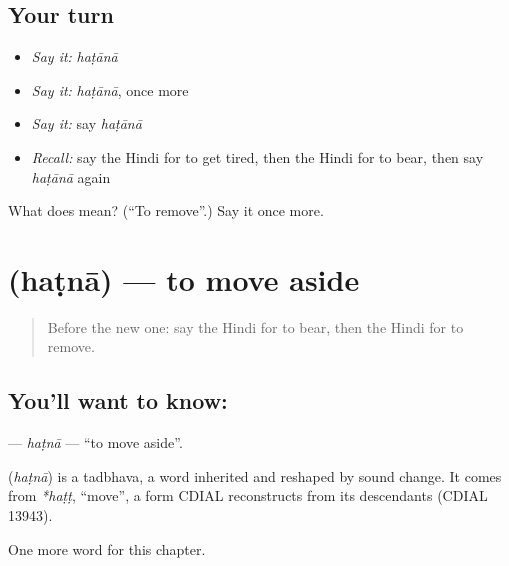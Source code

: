 \subsection*{Your turn}
\begin{itemize}
\raggedright
  \item \emph{Say it:} \emph{haṭānā}
  \item \emph{Say it:} \emph{haṭānā}, once more
  \item \emph{Say it:} say \emph{haṭānā}
  \item \emph{Recall:} say the Hindi for to get tired, then the Hindi for to bear, then say \emph{haṭānā} again
\end{itemize}

\begin{tcolorbox}[breakable,colback=teal!4,colframe=teal!35!black,title={Before you move on}]
What does  mean? (\textquotedblleft{}To remove\textquotedblright{}.) Say it once more.
\end{tcolorbox}
\section[\texorpdfstring{\hi{हटना} (haṭnā)}{हटना (haṭnā)}]{ (haṭnā) — to move aside}

\label{lesson:HI-C179-hatna}



\begin{quote}
Before the new one: say the Hindi for to bear, then the Hindi for to remove.
\end{quote}

\subsection*{You'll want to know: }
\textbf{} — \emph{haṭnā} — \textquotedblleft{}to move aside\textquotedblright{}.

\begin{cousinweb}
\textbf{} (\emph{haṭnā}) is a tadbhava, a word inherited and reshaped by sound change. It comes from \emph{*haṭṭ}, \textquotedblleft{}move\textquotedblright{}, a form CDIAL reconstructs from its descendants (CDIAL 13943).
\end{cousinweb}

\begin{grammarlens}[title={What you've built}]
One more word for this chapter.
\end{grammarlens}

